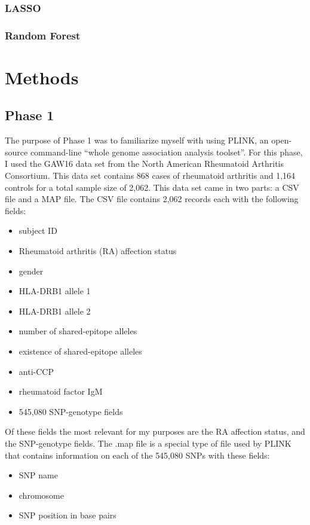 \documentclass[12pt]{report}
\begin{document}
\subsection{LASSO}
\subsection{Random Forest}


\chapter{Methods}
\section{Phase 1}
The purpose of Phase 1 was to familiarize myself with using PLINK, an open-source
command-line ``whole genome association analysis toolset''\cite{Chang}. For this
phase, I used the GAW16 data set from the North American Rheumatoid Arthritis
Consortium. This data set contains 868 cases of rheumatoid arthritis and 1,164 
controls for a total sample size of 2,062. This data set came in two parts: 
a CSV file and a MAP file. The CSV file contains 2,062 records each with the 
following fields:
\begin{itemize}
    \item{subject ID}
    \item{Rheumatoid arthritis (RA) affection status}
    \item{gender}
    \item{HLA-DRB1 allele 1}
    \item{HLA-DRB1 allele 2}
    \item{number of shared-epitope alleles}
    \item{existence of shared-epitope alleles}
    \item{anti-CCP}
    \item{rheumatoid factor IgM}
    \item{545,080 SNP-genotype fields}
\end{itemize}
Of these fields the most relevant for my purposes are the RA affection status,
and the SNP-genotype fields. The .map file is a special type of file used by
PLINK that contains information on each of the 545,080 SNPs with these fields:
\begin{itemize}
    \item{SNP name}
    \item{chromosome}
    \item{SNP position in base pairs}
\end{itemize}
\end{document}
